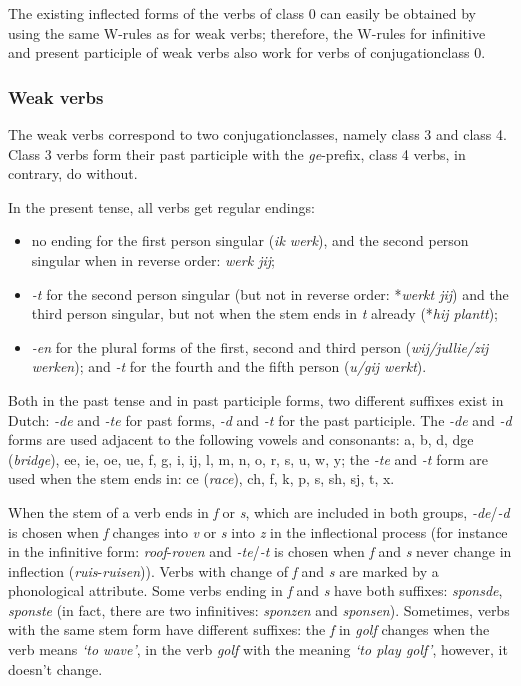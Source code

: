 The existing inflected forms of the verbs of class 0 can easily be obtained 
by using the same W-rules as for weak verbs; therefore, the 
W-rules for infinitive and present participle of weak verbs also work for verbs 
of conjugationclass 0.


\subsubsection{Weak verbs}

The weak verbs correspond to two conjugationclasses, namely class 3 and
class 4. Class 3 verbs form their past participle 
with the {\em ge}-prefix, class 4
verbs, in contrary, do without.

In the present tense, all verbs get regular endings: 

\begin{itemize}
 \item no ending for the first person singular ({\em ik werk}), and the second 
       person singular when in reverse order: {\em werk jij};
 \item {\em -t} for the second person singular (but not in reverse order: 
       *{\em werkt jij}) and the 
       third person singular, but not when the stem ends in {\em t} already 
       (*{\em hij plantt});
 \item {\em -en} for the plural forms of the first, second and third person 
       ({\em wij/jullie/zij werken}); and {\em -t} for the fourth and the 
       fifth person ({\em u/gij werkt}).
\end{itemize}

Both in the past tense and in past participle
forms, two different suffixes exist in Dutch: {\em -de} and {\em -te}
 for past forms,
{\em -d} and {\em -t} for the past participle. 
The {\em -de} and {\em -d} forms are used 
adjacent to the following vowels and consonants: a, b, d, dge 
({\em bridge}), ee, ie, oe, ue, f, g, i, ij, l, m, n, o, r, s, u, w, y; 
the {\em -te} and {\em -t} form are used when 
the stem ends in: ce ({\em race}), ch, f, k, p, s, sh, sj, t, x.

When the stem of a verb ends in {\em f} or {\em s}, which are included in 
both groups, {\em -de}/{\em -d} is chosen when {\em f} changes into {\em v} 
or {\em s} into {\em z} in the inflectional process (for instance in the 
infinitive form: {\em roof}-{\em roven} 
and {\em -te}/{\em -t} is chosen when {\em f} and {\em s} never change in 
inflection ({\em ruis}-{\em ruisen})). Verbs with change of {\em f} and
{\em s} are marked by a phonological attribute.
Some verbs ending in {\em f} and {\em s} have both suffixes: {\em sponsde}, 
{\em sponste} (in fact, there are two infinitives: {\em sponzen} and 
{\em sponsen}). Sometimes, verbs with the same stem form have different
suffixes: the {\em f} in {\em golf} changes when the verb means {\em `to wave'},
in the verb {\em golf} with the meaning {\em `to play golf'}, however, it 
doesn't change.

